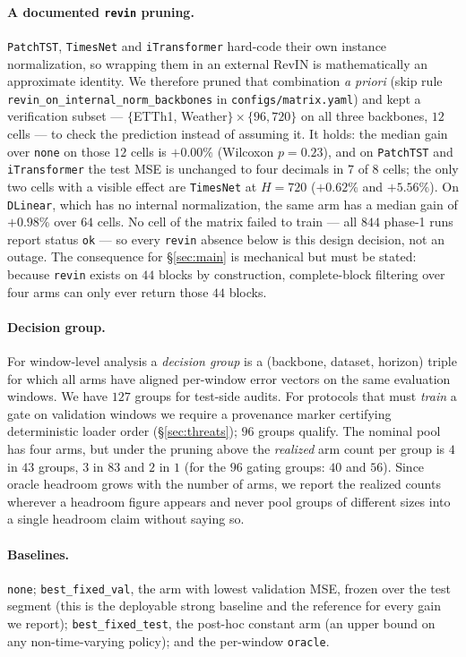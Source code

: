 \documentclass[a4paper,fleqn]{cas-sc}
\newcommand{\arm}[1]{\texttt{#1}}
\begin{document}
\paragraph{A documented \arm{revin} pruning.}
\arm{PatchTST}, \arm{TimesNet} and \arm{iTransformer} hard-code their own
instance normalization, so wrapping them in an external RevIN is mathematically
an approximate identity. We therefore pruned that combination \emph{a priori}
(skip rule \texttt{revin\_on\_internal\_norm\_backbones} in
\texttt{configs/matrix.yaml}) and kept a verification subset ---
$\{$ETTh1, Weather$\}\times\{96,720\}$ on all three backbones, $12$ cells --- to
check the prediction instead of assuming it. It holds: the median gain over
\arm{none} on those $12$ cells is $+0.00\%$ (Wilcoxon $p{=}0.23$), and on
\arm{PatchTST} and \arm{iTransformer} the test MSE is unchanged to four decimals
in $7$ of $8$ cells; the only two cells with a visible effect are \arm{TimesNet}
at $H{=}720$ ($+0.62\%$ and $+5.56\%$). On \arm{DLinear}, which has no internal
normalization, the same arm has a median gain of $+0.98\%$ over $64$ cells. No
cell of the matrix failed to train --- all $844$ phase-1 runs report status
\texttt{ok} --- so every \arm{revin} absence below is this design decision, not
an outage. The consequence for \S\ref{sec:main} is mechanical but must be
stated: because \arm{revin} exists on $44$ blocks by construction,
complete-block filtering over four arms can only ever return those $44$ blocks.

\paragraph{Decision group.}
For window-level analysis a \emph{decision group} is a
(backbone, dataset, horizon) triple for which all arms have aligned per-window
error vectors on the same evaluation windows. We have $127$ groups for test-side
audits. For protocols that must \emph{train} a gate on validation windows we
require a provenance marker certifying deterministic loader order
(\S\ref{sec:threats}); $96$ groups qualify. The nominal pool has four arms, but
under the pruning above the \emph{realized} arm count per group is $4$ in $43$
groups, $3$ in $83$ and $2$ in $1$ (for the $96$
gating groups: $40$ and $56$). Since oracle headroom grows with the number of
arms, we report the realized counts wherever a headroom figure appears and never
pool groups of different sizes into a single headroom claim without saying so.

\paragraph{Baselines.} \arm{none}; \arm{best\_fixed\_val}, the arm with lowest
validation MSE, frozen over the test segment (this is the deployable strong
baseline and the reference for every gain we report); \arm{best\_fixed\_test},
the post-hoc constant arm (an upper bound on any non-time-varying policy); and
the per-window \arm{oracle}.
\end{document}
